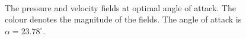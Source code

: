 \documentclass[12pt, a4paper]{article}
\begin{document}
        \begin{figure}[htbp]
            \centering
             \\
            \caption{The pressure and velocity fields at optimal angle of attack. The colour denotes the magnitude of the fields. The angle of attack is $\alpha = 23.78^\circ$.}
            \label{fig_opt_angle}
        \end{figure}
            
\end{document}
